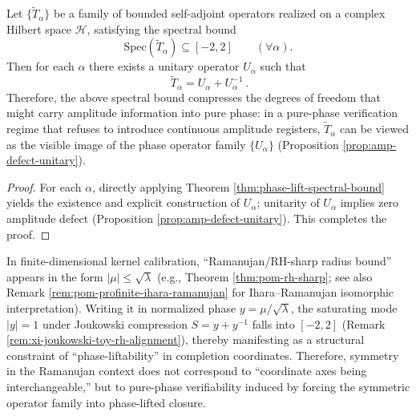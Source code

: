 \begin{theorem}\label{thm:ramanujan-phase-lift-principle}
Let \(\{\widetilde T_\alpha\}\) be a family of bounded self-adjoint operators realized on a complex Hilbert space \(\mathcal H\), satisfying the spectral bound
\[
\mathrm{Spec}(\widetilde T_\alpha)\subseteq[-2,2]\qquad(\forall \alpha).
\]
Then for each \(\alpha\) there exists a unitary operator \(U_\alpha\) such that
\[
\boxed{\ \widetilde T_\alpha=U_\alpha+U_\alpha^{-1}\ }.
\]
Therefore, the above spectral bound compresses the degrees of freedom that might carry amplitude information into pure phase: in a pure-phase verification regime that refuses to introduce continuous amplitude registers, \(\widetilde T_\alpha\) can be viewed as the visible image of the phase operator family \(\{U_\alpha\}\) (Proposition \ref{prop:amp-defect-unitary}).
\end{theorem}
\begin{proof}
For each \(\alpha\), directly applying Theorem \ref{thm:phase-lift-spectral-bound} yields the existence and explicit construction of \(U_\alpha\); unitarity of \(U_\alpha\) implies zero amplitude defect (Proposition \ref{prop:amp-defect-unitary}). This completes the proof.
\end{proof}

\begin{remark}\label{rem:ramanujan-phase-lift-kernel}
In finite-dimensional kernel calibration, ``Ramanujan/RH-sharp radius bound'' appears in the form \(|\mu|\le\sqrt{\lambda}\) (e.g., Theorem \ref{thm:pom-rh-sharp}; see also Remark \ref{rem:pom-profinite-ihara-ramanujan} for Ihara--Ramanujan isomorphic interpretation).
Writing it in normalized phase \(y=\mu/\sqrt{\lambda}\), the saturating mode \(|y|=1\) under Joukowski compression \(S=y+y^{-1}\) falls into \([-2,2]\) (Remark \ref{rem:xi-joukowski-toy-rh-alignment}), thereby manifesting as a structural constraint of ``phase-liftability'' in completion coordinates.
Therefore, symmetry in the Ramanujan context does not correspond to ``coordinate axes being interchangeable,'' but to pure-phase verifiability induced by forcing the symmetric operator family into phase-lifted closure.
\end{remark}


